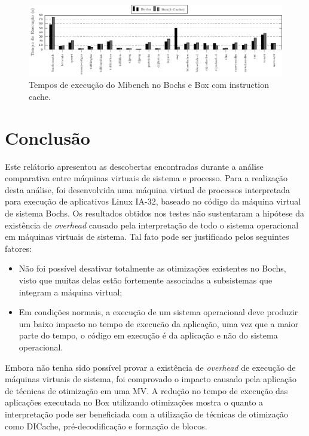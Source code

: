 \documentclass[11pt,twoside]{article}
\begin{document}
\begin{figure}[h]
        \centering
        \includegraphics[width=1.0\textwidth]{figures/bochs_icache}
        \caption{Tempos de execução do Mibench no Bochs e Box com instruction cache.}
        \label{fig:bochs_icache}
\end{figure}

\section{Conclusão} \label{sec:conclusao}

Este relátorio apresentou as descobertas encontradas durante a análise
comparativa entre máquinas virtuais de sistema e processo.  Para a realização
desta análise, foi desenvolvida uma máquina virtual de processos interpretada
para execução de aplicativos Linux IA-32, baseado no código da máquina virtual
de sistema Bochs.  
Os resultados obtidos nos testes não sustentaram a hipótese da
existência de \emph{overhead} causado pela interpretação de todo o sistema operacional
em máquinas virtuais de sistema. Tal fato pode ser justificado pelos seguintes
fatores:

\begin{itemize}
 \item Não foi possível desativar totalmente as otimizações existentes no Bochs,
   visto que muitas delas estão fortemente associadas a subsistemas que integram
   a máquina virtual;
 \item Em condições normais, a execução de um sistema operacional deve produzir
   um baixo impacto no tempo de execucão da aplicação, uma vez que a maior parte
   do tempo, o código em execução é da aplicação e não do sistema operacional.
\end{itemize}

Embora não tenha sido possível provar a existência de \emph{overhead} de
execução de máquinas virtuais de sistema, foi comprovado o impacto causado pela
aplicação de técnicas de otimização em uma MV. A redução no tempo
de execução das aplicações executada no Box utilizando otimizações mostra o
quanto a interpretação pode ser beneficiada com a utilização de técnicas de
otimização como DICache, pré-decodificação e formação de blocos.
\end{document}
